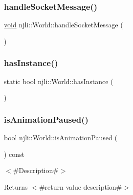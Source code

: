 \subsubsection{\texorpdfstring{handle\+Socket\+Message()}{handleSocketMessage()}}
{\footnotesize\ttfamily \mbox{\hyperlink{_thread_8h_af1e856da2e658414cb2456cb6f7ebc66}{void}} njli\+::\+World\+::handle\+Socket\+Message (\begin{DoxyParamCaption}{ }\end{DoxyParamCaption})\hspace{0.3cm}{\ttfamily [protected]}}

\mbox{\label{classnjli_1_1_world_a9c8ccd2a51131b026b1ee6c9135eea8b}} 
\subsubsection{\texorpdfstring{has\+Instance()}{hasInstance()}}
{\footnotesize\ttfamily static bool njli\+::\+World\+::has\+Instance (\begin{DoxyParamCaption}{ }\end{DoxyParamCaption})\hspace{0.3cm}{\ttfamily [static]}}

\mbox{\label{classnjli_1_1_world_ac84f5b1da4bbd124829f30b7a3fbd4d0}} 
\subsubsection{\texorpdfstring{is\+Animation\+Paused()}{isAnimationPaused()}}
{\footnotesize\ttfamily bool njli\+::\+World\+::is\+Animation\+Paused (\begin{DoxyParamCaption}{ }\end{DoxyParamCaption}) const}

$<$\#\+Description\#$>$

\begin{DoxyReturn}{Returns}
$<$\#return value description\#$>$ 
\end{DoxyReturn}
\mbox{\label{classnjli_1_1_world_a6470e58e64be02c4bf71a201417bcbbc}} 
